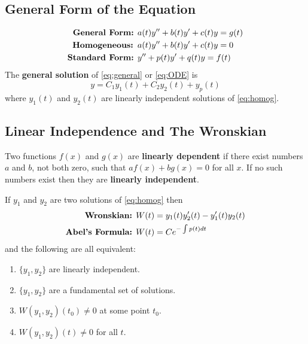 \documentclass[10pt,portrait, leqno]{article}
\begin{document}
\begin{multicols}{2}

\subsection*{General Form of the Equation}
\begin{align} 
\text{{\textbf{General Form:} }}&
a(t)y''+b(t)y'+c(t)y=g(t) \label{eq:general}\\
\text{\textbf{{Homogeneous:} }}&
a(t)y''+b(t)y'+c(t)y=0\label{eq:homog}\\
\text{{\textbf{Standard Form:} }}&
y''+p(t)y'+q(t)y=f(t)
\label{eq:ODE}
\end{align}
The \textbf{general solution} of \eqref{eq:general} or \eqref{eq:ODE} is 
\begin{equation}
y = C_1 y_1(t) + C_2 y_2 (t) + y_p(t)
\end{equation}
where $y_1(t)$ and $y_2(t)$ are linearly independent solutions of \eqref{eq:homog}.

\subsection*{Linear Independence and The Wronskian}
Two functions $f(x)$ and $g(x)$ are \textbf{linearly dependent} if there exist numbers $a$ and $b$, not both zero, such that $af(x)+bg(x)=0$ for all $x$. If no such numbers exist then they are \textbf{linearly independent}.

If $y_1$ and $y_2$ are two solutions of \eqref{eq:homog} then 
\begin{align}
\text{\textbf{Wronskian:} } & W(t) = y_1(t) y_2'(t) - y_1'(t) y_2(t)\\
\text{\textbf{Abel's Formula:} }&W(t) = Ce^{-\int{p(t)dt}}
\end{align}
and the following are all equivalent: 
\begin{enumerate}
\item $\{y_1,y_2\}$ are linearly independent.
\item $\{y_1,y_2\}$ are a fundamental set of solutions.
\item $W(y_1, y_2)(t_0)\neq 0$ at some point $t_0$.
\item $W(y_1,y_2)(t) \neq 0$ for all $t$.
\end{enumerate}



\end{multicols}
\end{document}
